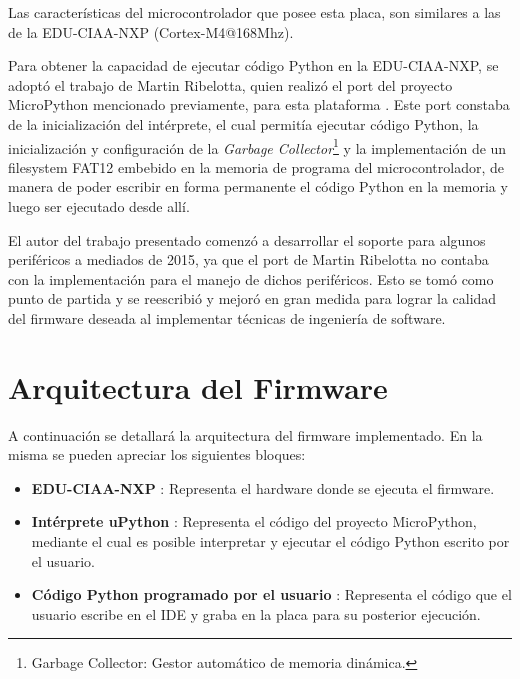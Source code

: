 Las características del microcontrolador que posee esta placa, son similares a las de la EDU-CIAA-NXP (Cortex-M4@168Mhz).

Para obtener la capacidad de ejecutar código Python en la EDU-CIAA-NXP, se adoptó el trabajo de Martin Ribelotta, quien realizó el port del proyecto MicroPython mencionado previamente, para esta plataforma \cite{portmicropythonribelotta}.
Este port constaba de la inicialización del intérprete, el cual permitía ejecutar código Python, la inicialización y configuración de la \textit{Garbage Collector}\footnote{Garbage Collector: Gestor automático de memoria dinámica.} y la implementación de un filesystem FAT12 embebido en la memoria de programa del microcontrolador, de manera de poder escribir en forma permanente el código Python en la memoria y luego ser ejecutado desde allí. 


El autor del trabajo presentado comenzó a desarrollar el soporte para algunos periféricos a mediados de 2015, ya que el port de Martin Ribelotta no contaba con la implementación para el manejo de dichos periféricos. Esto se tomó como punto de partida y se reescribió y mejoró en gran medida para lograr la calidad del firmware deseada al implementar técnicas de ingeniería de software.

\section{Arquitectura del Firmware}
\label{sec:firmwareArq}

A continuación se detallará la arquitectura del firmware implementado. En la misma se pueden apreciar los siguientes bloques:

\begin{itemize}
	\item \textbf{EDU-CIAA-NXP} : Representa el hardware donde se ejecuta el firmware.
	\item \textbf{Intérprete uPython} : Representa el código del proyecto MicroPython, mediante el cual es posible interpretar y ejecutar el código Python escrito por el usuario.
	\item \textbf{Código Python programado por el usuario} : Representa el código que el usuario escribe en el IDE y graba en la placa para su posterior ejecución.
\end{itemize}

